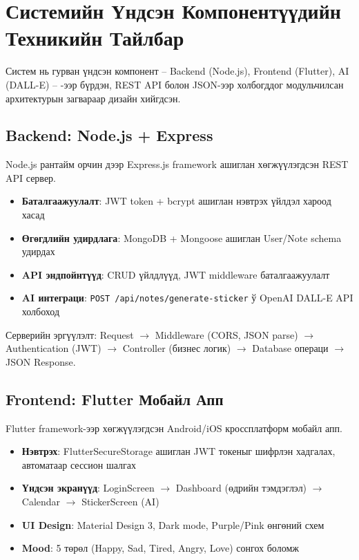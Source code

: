 \section{Системийн Үндсэн Компонентүүдийн Техникийн Тайлбар}

Систем нь гурван үндсэн компонент -- Backend (Node.js), Frontend (Flutter), AI (DALL-E) -- -ээр бүрдэн,
REST API болон JSON-ээр холбогддог модульчилсан архитектурын загвараар дизайн хийгдсэн.

\subsection{Backend: Node.js + Express}

Node.js рантайм орчин дээр Express.js framework ашиглан хөгжүүлэгдсэн REST API сервер. 

\begin{itemize}
  \item \textbf{Баталгаажуулалт}: JWT token + bcrypt ашиглан нэвтрэх үйлдэл хароод хасад
  \item \textbf{Өгөгдлийн удирдлага}: MongoDB + Mongoose ашиглан User/Note schema удирдах
  \item \textbf{API эндпойнтүүд}: CRUD үйлдлүүд, JWT middleware баталгаажуулалт
  \item \textbf{AI интеграци}: \texttt{POST /api/notes/generate-sticker} ў OpenAI DALL-E API холбоход
\end{itemize}

Серверийн эргүүлэлт: Request $\rightarrow$ Middleware (CORS, JSON parse) $\rightarrow$ Authentication (JWT) $\rightarrow$ Controller (бизнес логик) $\rightarrow$ Database операци $\rightarrow$ JSON Response.

\subsection{Frontend: Flutter Мобайл Апп}

Flutter framework-ээр хөгжүүлэгдсэн Android/iOS кроссплатформ мобайл апп.

\begin{itemize}
  \item \textbf{Нэвтрэх}: FlutterSecureStorage ашиглан JWT токеныг шифрлэн хадгалах, автоматаар сессион шалгах
  \item \textbf{Үндсэн экранүүд}: LoginScreen $\rightarrow$ Dashboard (өдрийн тэмдэглэл) $\rightarrow$ Calendar $\rightarrow$ StickerScreen (AI)
  \item \textbf{UI Design}: Material Design 3, Dark mode, Purple/Pink өнгөний схем
  \item \textbf{Mood}: 5 төрөл (Happy, Sad, Tired, Angry, Love) сонгох боломж
\end{itemize}

